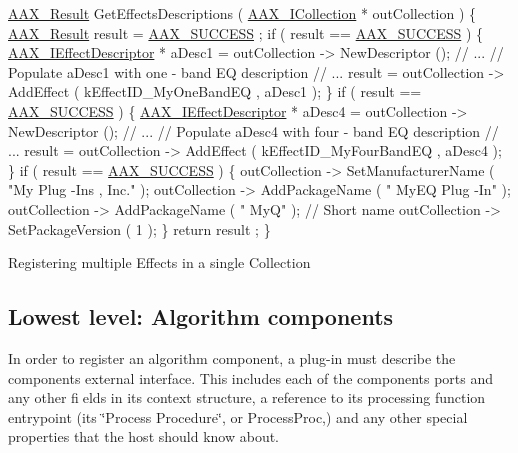 \begin{DoxyCode}
\hyperlink{a00149_a4d8f69a697df7f70c3a8e9b8ee130d2f}{AAX\_Result} GetEffectsDescriptions ( \hyperlink{a00087}{AAX\_ICollection} * outCollection )
\{
    \hyperlink{a00149_a4d8f69a697df7f70c3a8e9b8ee130d2f}{AAX\_Result} result = \hyperlink{a00207_a5f8c7439f3a706c4f8315a9609811937aeddbd1bb67e3a66e6af54a4b4a7a57b3}{AAX\_SUCCESS} ;
    \textcolor{keywordflow}{if} ( result == \hyperlink{a00207_a5f8c7439f3a706c4f8315a9609811937aeddbd1bb67e3a66e6af54a4b4a7a57b3}{AAX\_SUCCESS} )
    \{
        \hyperlink{a00096}{AAX\_IEffectDescriptor} * aDesc1 = outCollection -> NewDescriptor ();
        \textcolor{comment}{// ...}
        \textcolor{comment}{// Populate aDesc1 with one - band EQ description}
        \textcolor{comment}{// ...}
        result = outCollection -> AddEffect ( kEffectID\_MyOneBandEQ , aDesc1 );
    \}
    \textcolor{keywordflow}{if} ( result == \hyperlink{a00207_a5f8c7439f3a706c4f8315a9609811937aeddbd1bb67e3a66e6af54a4b4a7a57b3}{AAX\_SUCCESS} )
    \{
        \hyperlink{a00096}{AAX\_IEffectDescriptor} * aDesc4 = outCollection -> NewDescriptor ();
        \textcolor{comment}{// ...}
        \textcolor{comment}{// Populate aDesc4 with four - band EQ description}
        \textcolor{comment}{// ...}
        result = outCollection -> AddEffect ( kEffectID\_MyFourBandEQ , aDesc4 );
    \}
    \textcolor{keywordflow}{if} ( result == \hyperlink{a00207_a5f8c7439f3a706c4f8315a9609811937aeddbd1bb67e3a66e6af54a4b4a7a57b3}{AAX\_SUCCESS} )
    \{
        outCollection -> SetManufacturerName ( \textcolor{stringliteral}{"My Plug -Ins ,  Inc."} );
        outCollection -> AddPackageName ( \textcolor{stringliteral}{" MyEQ  Plug -In"} );
        outCollection -> AddPackageName ( \textcolor{stringliteral}{" MyQ"} ); \textcolor{comment}{// Short name}
        outCollection -> SetPackageVersion ( 1 );
    \}
    \textcolor{keywordflow}{return} result ;
\}
\end{DoxyCode}
 Registering multiple Effects in a single Collection



 \hypertarget{a00326_describe_component}{}\subsection{Lowest level\+: Algorithm components}\label{a00326_describe_component}
 In order to register an algorithm component, a plug-\/in must describe the component\textquotesingle{}s external interface. This includes each of the component\textquotesingle{}s ports and any other fields in its context structure, a reference to its processing function entrypoint (its \char`\"{}\+Process Procedure\char`\"{}, or Process\+Proc,) and any other special properties that the host should know about.

